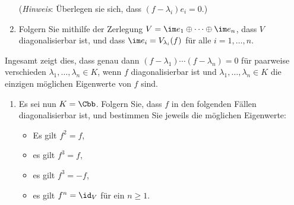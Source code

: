 \begin{question}
\begin{enumerate}[resume]
      (\emph{Hinweis}:
       Überlegen sie sich, dass $(f - \lambda_i) e_i = 0$.)
    \item
      Folgern Sie mithilfe der Zerlegung $V = \im e_1 \oplus \dotsb \oplus \im e_n$, dass $V$ diagonalisierbar ist, und dass $\im e_i = V_{\lambda_i}(f)$ für alle $i = 1, \dotsc, n$.
  \end{enumerate}
  Ingesamt zeigt dies, dass genau dann $(f - \lambda_1) \dotsm (f - \lambda_n) = 0$ für paarweise verschieden $\lambda_1, \dotsc, \lambda_n \in K$, wenn $f$ diagonalisierbar ist und $\lambda_1, \dotsc, \lambda_n \in K$ die einzigen möglichen Eigenwerte von $f$ sind.
  \begin{enumerate}[resume]
    \item 
      Es sei nun $K = \Cbb$.
      Folgern Sie, dass $f$ in den folgenden Fällen diagonalisierbar ist, und bestimmen Sie jeweils die möglichen Eigenwerte:
      \begin{itemize}
        \item
          Es gilt $f^2 = f$,
        \item
          es gilt $f^3 = f$,
        \item
          es gilt $f^3 = -f$,
        \item
          es gilt $f^n = \id_V$ für ein $n \geq 1$.
      \end{itemize}
  \end{enumerate}
\end{question}
